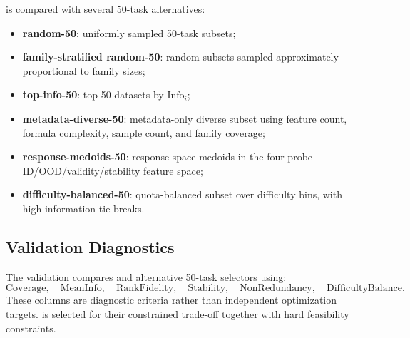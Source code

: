 \core{} is compared with several 50-task alternatives:
\begin{itemize}[leftmargin=*]
    \item \textbf{random-50}: uniformly sampled 50-task subsets;
    \item \textbf{family-stratified random-50}: random subsets sampled approximately proportional to family sizes;
    \item \textbf{top-info-50}: top 50 datasets by \(\mathrm{Info}_i\);
    \item \textbf{metadata-diverse-50}: metadata-only diverse subset using feature count, formula complexity, sample count, and family coverage;
    \item \textbf{response-medoids-50}: response-space medoids in the four-probe ID/OOD/validity/stability feature space;
    \item \textbf{difficulty-balanced-50}: quota-balanced subset over difficulty bins, with high-information tie-breaks.
\end{itemize}


\subsection{Validation Diagnostics}
\label{app:core50-validation-diagnostics}

The validation compares \core{} and alternative 50-task selectors using:
\[
\mathrm{Coverage},
\quad
\mathrm{MeanInfo},
\quad
\mathrm{RankFidelity},
\quad
\mathrm{Stability},
\quad
\mathrm{NonRedundancy},
\quad
\mathrm{DifficultyBalance}.
\]
These columns are diagnostic criteria rather than independent optimization targets. \core{} is selected for their constrained trade-off together with hard feasibility constraints.

\begin{table}[ht]
\centering
\small
\caption{\textbf{Subset-quality summary for \core{} and alternative 50-task selectors.} Higher is better within each diagnostic column, but \core{} is selected for a constrained trade-off rather than for optimizing any single column.}
\label{tab:core50-baseline-quality-audit}
\end{table}

